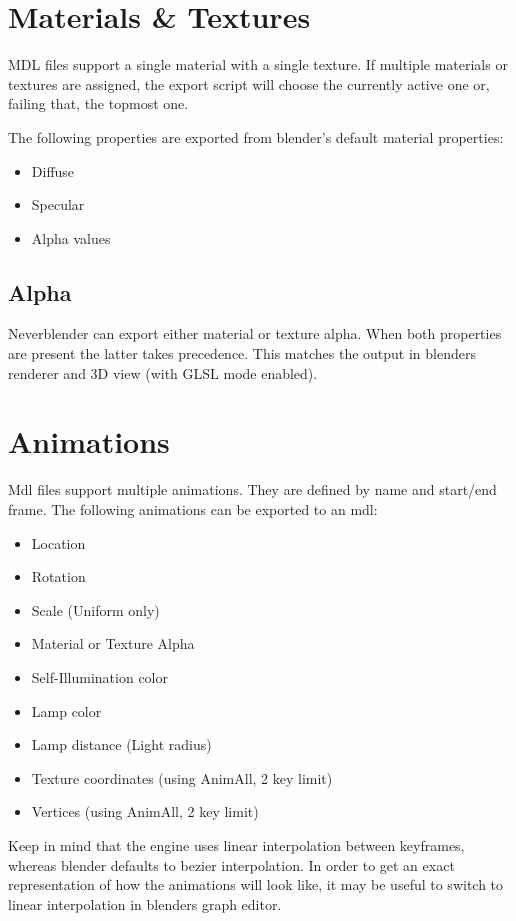 \section{Materials \& Textures}
MDL files support a single material with a single texture. If multiple 
materials or textures are assigned, the export script will choose the currently 
active one or, failing that, the topmost one.

The following properties are exported from blender's default material properties:
\begin{itemize}
    \item Diffuse
    \item Specular
    \item Alpha values
\end{itemize}

\subsection*{Alpha}
Neverblender can export either material or texture alpha. When both properties are present 
the latter takes precedence. This matches the output in blenders renderer 
and 3D view (with GLSL mode enabled).

\section{Animations}
Mdl files support multiple animations. They are defined by name and start/end frame.
The following animations can be exported to an mdl:
\begin{itemize}
    \item Location
    \item Rotation
    \item Scale (Uniform only)
    \item Material or Texture Alpha
    \item Self-Illumination color
    \item Lamp color
    \item Lamp distance (Light radius)
    \item Texture coordinates (using AnimAll, 2 key limit)
    \item Vertices (using AnimAll, 2 key limit)
\end{itemize}
Keep in mind that the engine uses linear interpolation between keyframes, whereas blender 
defaults to bezier interpolation. In order to get an exact representation of how the animations will 
look like, it may be useful to switch to linear interpolation in blenders graph editor.

